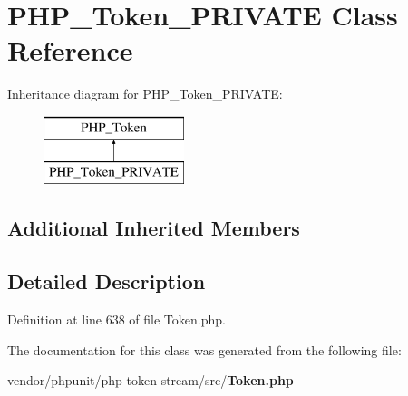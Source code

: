 \section{P\+H\+P\+\_\+\+Token\+\_\+\+P\+R\+I\+V\+A\+T\+E Class Reference}
\label{class_p_h_p___token___p_r_i_v_a_t_e}
Inheritance diagram for P\+H\+P\+\_\+\+Token\+\_\+\+P\+R\+I\+V\+A\+T\+E\+:\begin{figure}[H]
\begin{center}
\leavevmode
\includegraphics[height=2.000000cm]{class_p_h_p___token___p_r_i_v_a_t_e}
\end{center}
\end{figure}
\subsection*{Additional Inherited Members}


\subsection{Detailed Description}


Definition at line 638 of file Token.\+php.



The documentation for this class was generated from the following file\+:\begin{DoxyCompactItemize}
\item 
vendor/phpunit/php-\/token-\/stream/src/{\bf Token.\+php}\end{DoxyCompactItemize}
